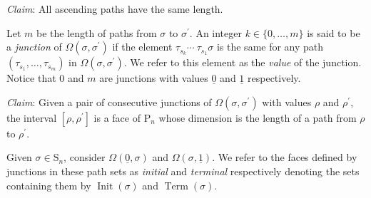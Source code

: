 \documentclass{amsart}
\renewcommand{\S}{\mathrm S}
\renewcommand{\P}{\mathrm P}
\DeclareMathOperator{\trace}{Trace}
\DeclareMathOperator{\init}{Init}
\DeclareMathOperator{\term}{Term}
\begin{document}
\textit{Claim}: All ascending paths have the same length.

Let $m$ be the length of paths from $\sigma$ to $\sigma^\prime$.
An integer $k \in \{0, \dots, m\}$ is said to be a \textit{junction} of $\Omega(\sigma, \sigma^\prime)$ if the element $\tau_{s_k} \cdots\ \tau_{s_1} \sigma$ is the same for any path $(\tau_{s_1}, \dots, \tau_{s_m})$ in $\Omega(\sigma, \sigma^\prime)$.
We refer to this element as the \textit{value} of the junction.
Notice that $0$ and $m$ are junctions with values $\underline{0}$ and $\underline{1}$ respectively.

\textit{Claim}: Given a pair of consecutive junctions of $\Omega(\sigma, \sigma^\prime)$ with values $\rho$ and $\rho^\prime$, the interval $[\rho, \rho^\prime]$ is a face of $\P_n$ whose dimension is the length of a path from $\rho$ to $\rho^\prime$.

Given $\sigma \in \S_n$, consider $\Omega(\underline 0, \sigma)$ and $\Omega(\sigma, \underline 1)$. We refer to the faces defined by junctions in these path sets as \textit{initial} and \textit{terminal} respectively denoting the sets containing them by $\init(\sigma)$ and $\term(\sigma)$.

%



\newpage


\end{document}
